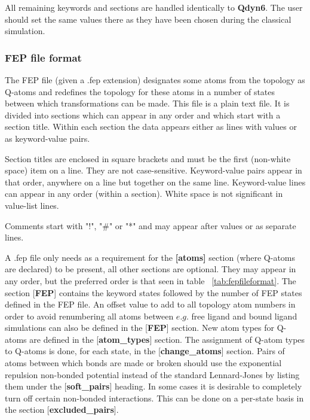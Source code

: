 \documentclass[a4paper,11pt]{article}
\let\origref\ref
\def\ref#1{\unskip~\origref{#1}}
\begin{document}
\normalsize
All remaining keywords and sections are handled identically to \textbf{Qdyn6}. The user
should set the same values there as they have been chosen during the 
classical simulation.


\subsubsection{FEP file format}
\label{subsubsec:fepfileformat}

The FEP file  (given a .fep extension) designates some  atoms from the
topology as  Q-atoms and redefines the  topology for these atoms  in a
number of states between which  transformations can be made. This file
is a plain text file. It is  divided into sections which can appear in
any order  and which start with  a section title. Within  each section
the data appears either as lines with values or as keyword-value pairs.

Section titles are  enclosed in square brackets and must  be the first
(non-white    space)    item    on    a    line.    They    are    not
case-sensitive. Keyword-value pairs appear  in that order, anywhere on
a line but  together on the same line. Keyword-value  lines can appear
in any  order (within a  section). White  space is not  significant in
value-list lines.

Comments start with "!", "\#" or "*" and may appear after values or as
separate lines.

A  .fep file  only needs  as  a requirement  for the  \textbf{[atoms]}
section (where  Q-atoms are  declared) to be  present, all  other 
sections are optional. They may appear in any order, but the preferred
order is that seen in table \ref{tab:fepfileformat}.  The section
[\textbf{FEP}] contains the  keyword states followed by  the number of
FEP states  defined in  the FEP file.  An offset value  to add  to all
topology atom numbers in order  to avoid renumbering all atoms between
$e.g.$ free ligand and bound ligand simulations can also be defined in
the [\textbf{FEP}] section. New atom  types for Q-atoms are defined in
the [\textbf{atom\_types}] section. The  assignment of Q-atom types to
Q-atoms  is  done, for  each  state,  in the  [\textbf{change\_atoms}]
section. Pairs of atoms between which  bonds are made or broken should
use  the exponential  repulsion  non-bonded potential  instead of  the
standard     Lennard-Jones    by     listing     them    under     the
[\textbf{soft\_pairs}]  heading.  In some  cases  it  is desirable  to
completely turn off certain non-bonded  interactions. This can be done
on a per-state basis in the section [\textbf{excluded\_pairs}].
\end{document}
